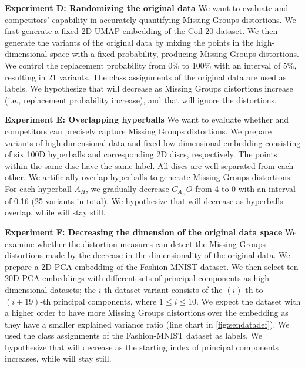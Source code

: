 \noindent
\textbf{Experiment D: Randomizing the original data}
We want to evaluate \ltc and competitors' capability in accurately quantifying Missing Groups distortions. 
We first generate a fixed 2D UMAP embedding of the Coil-20 \cite{nene96tech} dataset. 
We then generate the variants of the original data by mixing the points in the high-dimensional space with a fixed probability, producing Missing Groups distortions. We control the replacement probability from 0\% to 100\% with an interval of 5\%, resulting in 21 variants. 
The class assignments of the original data are used as labels.
We hypothesize that \lc will decrease as Missing Groups distortions increase (i.e., replacement probability increase), and that \lt will ignore the distortions.


\noindent
\textbf{Experiment E: Overlapping hyperballs}
We want to evaluate whether \ltc and competitors can precisely capture Missing Groups distortions. 
We prepare variants of high-dimensional data and fixed low-dimensional embedding consisting of six 100D hyperballs and corresponding 2D discs, respectively. 
The points within the same disc have the same label. All discs are well separated from each other.
We artificially overlap hyperballs to generate Missing Groups distortions. 
For each hyperball $A_H$, we gradually decrease $C_{A_H}O$ from 4 to 0 with an interval of 0.16 (25 variants in total). %
We hypothesize that \lc will decrease as hyperballs overlap, while \lt will stay still.



\noindent
\textbf{Experiment F: Decreasing the dimension of the original data space}
We examine whether the distortion measures can detect the Missing Groups distortions made by the decrease in the dimensionality of the original data. We prepare a 2D PCA embedding of the Fashion-MNIST dataset. 
We then select ten 20D PCA embeddings with different sets of principal components as high-dimensional datasets; the $i$-th dataset variant consists of the $(i)$-th to $(i+19)$-th principal components, where $1 \leq i \leq 10$.
We expect the dataset with a higher order to have more Missing Groups distortions over the embedding as they have a smaller explained variance ratio (line chart in \autoref{fig:sendatadef}). 
We used the class assignments of the Fashion-MNIST dataset as labels.
We hypothesize that \lc will decrease as the starting index of principal components increases, while \lt will stay still.



